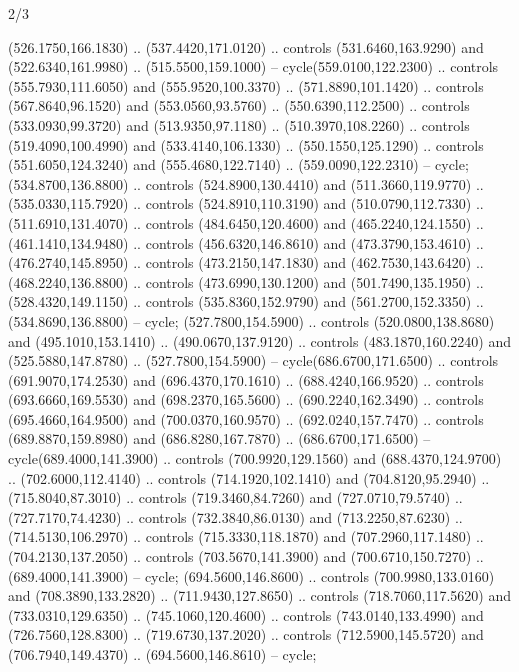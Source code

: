 \begin{flagdescription}{2/3}
\begin{scope}[xshift=0.5\flaglength,yshift=0.5\flagwidth,scale=\flagwidth/255]
\begin{scope}[y=-0.43pt, x=0.43pt,xshift=-193pt,yshift=133pt]
\begin{scope}[draw=black,line width=0.003\flagwidth]
\begin{scope}[fill=white]
  (526.1750,166.1830) .. (537.4420,171.0120) .. controls (531.6460,163.9290) and
  (522.6340,161.9980) .. (515.5500,159.1000) -- cycle(559.0100,122.2300) ..
  controls (555.7930,111.6050) and (555.9520,100.3370) .. (571.8890,101.1420) ..
  controls (567.8640,96.1520) and (553.0560,93.5760) .. (550.6390,112.2500) ..
  controls (533.0930,99.3720) and (513.9350,97.1180) .. (510.3970,108.2260) ..
  controls (519.4090,100.4990) and (533.4140,106.1330) .. (550.1550,125.1290) ..
  controls (551.6050,124.3240) and (555.4680,122.7140) .. (559.0090,122.2310) --
  cycle;
 (534.8700,136.8800) .. controls (524.8900,130.4410) and
  (511.3660,119.9770) .. (535.0330,115.7920) .. controls (524.8910,110.3190) and
  (510.0790,112.7330) .. (511.6910,131.4070) .. controls (484.6450,120.4600) and
  (465.2240,124.1550) .. (461.1410,134.9480) .. controls (456.6320,146.8610) and
  (473.3790,153.4610) .. (476.2740,145.8950) .. controls (473.2150,147.1830) and
  (462.7530,143.6420) .. (468.2240,136.8800) .. controls (473.6990,130.1200) and
  (501.7490,135.1950) .. (528.4320,149.1150) .. controls (535.8360,152.9790) and
  (561.2700,152.3350) .. (534.8690,136.8800) -- cycle;
 (527.7800,154.5900) .. controls (520.0800,138.8680) and
  (495.1010,153.1410) .. (490.0670,137.9120) .. controls (483.1870,160.2240) and
  (525.5880,147.8780) .. (527.7800,154.5900) -- cycle(686.6700,171.6500) ..
  controls (691.9070,174.2530) and (696.4370,170.1610) .. (688.4240,166.9520) ..
  controls (693.6660,169.5530) and (698.2370,165.5600) .. (690.2240,162.3490) ..
  controls (695.4660,164.9500) and (700.0370,160.9570) .. (692.0240,157.7470) ..
  controls (689.8870,159.8980) and (686.8280,167.7870) .. (686.6700,171.6500) --
  cycle(689.4000,141.3900) .. controls (700.9920,129.1560) and
  (688.4370,124.9700) .. (702.6000,112.4140) .. controls (714.1920,102.1410) and
  (704.8120,95.2940) .. (715.8040,87.3010) .. controls (719.3460,84.7260) and
  (727.0710,79.5740) .. (727.7170,74.4230) .. controls (732.3840,86.0130) and
  (713.2250,87.6230) .. (714.5130,106.2970) .. controls (715.3330,118.1870) and
  (707.2960,117.1480) .. (704.2130,137.2050) .. controls (703.5670,141.3900) and
  (700.6710,150.7270) .. (689.4000,141.3900) -- cycle;
 (694.5600,146.8600) .. controls (700.9980,133.0160) and
  (708.3890,133.2820) .. (711.9430,127.8650) .. controls (718.7060,117.5620) and
  (733.0310,129.6350) .. (745.1060,120.4600) .. controls (743.0140,133.4990) and
  (726.7560,128.8300) .. (719.6730,137.2020) .. controls (712.5900,145.5720) and
  (706.7940,149.4370) .. (694.5600,146.8610) -- cycle;

\end{scope}
\end{scope}
\end{scope}
\end{scope}
\end{flagdescription}
